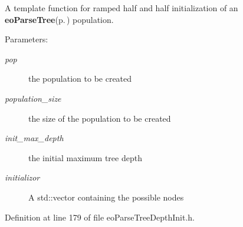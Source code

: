 A template function for ramped half and half initialization of an {\bf eo\-Parse\-Tree}{\rm (p.\,\pageref{classeo_parse_tree})} population. 

\begin{Desc}
\item[Parameters:]
\begin{description}
\item[{\em pop}]the population to be created \item[{\em population\_\-size}]the size of the population to be created \item[{\em init\_\-max\_\-depth}]the initial maximum tree depth \item[{\em initializor}]A std::vector containing the possible nodes \end{description}
\end{Desc}


Definition at line 179 of file eo\-Parse\-Tree\-Depth\-Init.h.